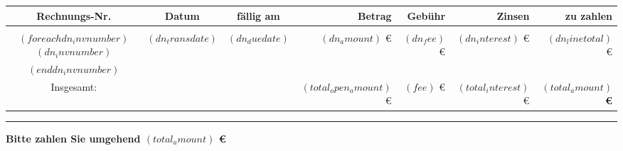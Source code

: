 \documentclass[twoside]{scrartcl}
\begin{document}
\setlength{\tabcolsep}{0mm}
\begin{tabular*}{\textwidth}{c@{\extracolsep\fill}c@{\extracolsep\fill}c@{\extracolsep\fill}r@{\extracolsep\fill}r@{\extracolsep\fill}r@{\extracolsep\fill}r}
  \textbf{Rechnungs-Nr.} & \textbf{Datum} & \textbf{fällig am} &
  \textbf{Betrag} & \textbf{Gebühr} & \textbf{Zinsen} & \textbf{zu zahlen} \\[1pt]
\hline\\
$(foreach dn_invnumber)$
  $(dn_invnumber)$ & $(dn_transdate)$ & $(dn_duedate)$ &
  $(dn_amount)$ \euro & $(dn_fee)$  \euro & $(dn_interest)$  \euro & $(dn_linetotal)$   \euro \\[1pt]
$(end dn_invnumber)$
\cline{1-7}\\
 Insgesamt: & & & $(total_open_amount)$ \euro & $(fee)$ \euro & $(total_interest)$ \euro & \textbf{$(total_amount)$  \euro}
\end{tabular*}
\rule{\textwidth}{0.5pt}

\vspace{0.5cm}

\hfill \textbf{Bitte zahlen Sie umgehend $(total_amount)$  \euro}
\end{document}
